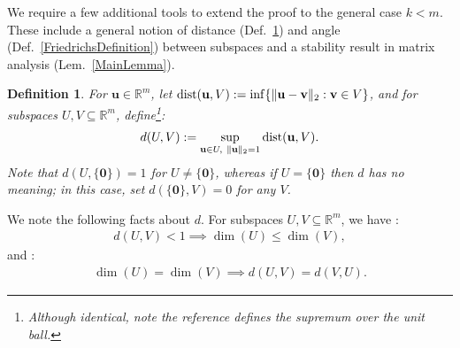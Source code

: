 \documentclass[9pt,twocolumn]{pnas-new}
\newtheorem{lemma}{Lemma}
\newtheorem{definition}{Definition}
\newtheorem{remark}{Remark}
\begin{document}


We require a few additional tools to extend the proof to the general case $k < m$. These include a general notion of distance (Def.~\ref{dDef}) and angle (Def.~\ref{FriedrichsDefinition}) between subspaces and a stability result in matrix analysis (Lem.~\ref{MainLemma}).

\begin{definition}\label{dDef}
For $\mathbf{u} \in \mathbb R^m$, let $\text{\rm dist}(\mathbf{u}, V) := \inf \{\| \mathbf{u}-\mathbf{v} \|_2: \mathbf{v} \in V\}$, and for subspaces $U,V \subseteq \mathbb{R}^m$, define\footnote{Although identical, note the reference \cite{Morris10} defines the supremum over the unit ball.}: %
\begin{align}\label{d}
d(U,V) := \sup_{\mathbf{u} \in U, \ \|\mathbf{u}\|_2 = 1} \text{\rm dist}(\mathbf{u},V).
\end{align}
Note that $d(U,\{\textbf{0}\}) = 1$ for $U \neq \{\mathbf{0}\}$, whereas if $U = \{\textbf{0}\}$ then $d$ has no meaning; in this case, set $d(\{\textbf{0}\},V) = 0$ for any $V$.
\end{definition}

We note the following facts about $d$. For subspaces $U,V \subseteq \mathbb{R}^m$, we have \cite[Cor.~2.6]{Kato2013}:
\begin{align}\label{dimLem}
d(U,V) < 1 \implies \dim(U) \leq \dim(V),
\end{align}
%
and \cite[Lem.~3.2]{Morris10}:
\begin{align}\label{eqdim}
\dim(U) = \dim(V) \implies d(U,V) = d(V,U).
\end{align}

\end{document}
